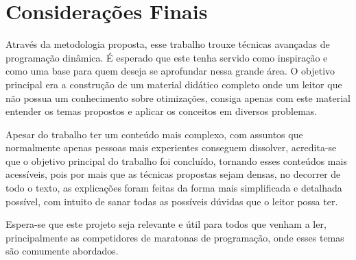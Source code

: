 \chapter{Considerações Finais}
\label{chap:conclusao}

Através da metodologia proposta, esse trabalho trouxe técnicas avançadas de programação dinâmica. É esperado que este tenha servido como inspiração e como uma base para quem deseja se aprofundar nessa grande área. O objetivo principal era a construção de um material didático completo onde um leitor que não possua um conhecimento sobre otimizações, consiga apenas com este material entender os temas propostos e aplicar os conceitos em diversos problemas.

Apesar do trabalho ter um conteúdo mais complexo, com assuntos que normalmente apenas pessoas mais experientes conseguem dissolver, acredita-se que o objetivo principal do trabalho foi concluído, tornando esses conteúdos mais acessíveis, pois por mais que as técnicas propostas sejam densas, no decorrer de todo o texto, as explicações foram feitas da forma mais simplificada e detalhada possível, com intuito de sanar todas as possíveis dúvidas que o leitor possa ter.

Espera-se que este projeto seja relevante e útil para todos que venham a ler, principalmente as competidores de maratonas de programação, onde esses temas são comumente abordados.